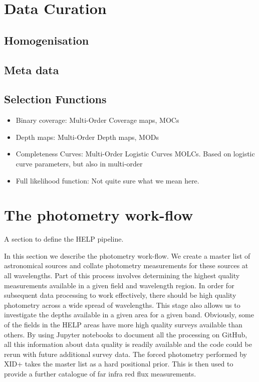 \documentclass[usenatbib]{mnras}
\begin{document}
\section{Data Curation}
\subsection{Homogenisation}
\subsection{Meta data}
\subsection{Selection Functions}
\begin{itemize}
  \item{Binary coverage:} Multi-Order Coverage maps, MOCs
  \item{Depth maps:} Multi-Order Depth maps, MODs
  \item{Completeness Curves:} Multi-Order Logistic Curves MOLCs. Based on
    logistic curve parameters, but also in multi-order
  \item{Full likelihood function:} Not quite sure what we mean here.
\end{itemize}


\section{The photometry work-flow}

{\color{red} A section to define the HELP pipeline.  }

In this section we describe the photometry work-flow.  We create a master list 
of astronomical sources and collate photometry measurements for these sources 
at all wavelengths. Part of this process involves determining the highest 
quality measurements available in a given field and wavelength region. In order 
for subsequent data processing to work effectively, there should be high quality 
photometry across a wide spread of wavelengths. This stage also allows us to 
investigate the depths available in a given area for a given band. Obviously,
some of the fields in the HELP areas have more high quality surveys available than others.
By using Jupyter notebooks to document all the processing on GitHub, all this 
information about data quality is readily available and the code could be rerun with future 
additional survey data. The forced photometry performed by XID+ takes the master list as a hard positional prior. This is then used to provide a further catalogue of far infra red flux measurements.
\end{document}
